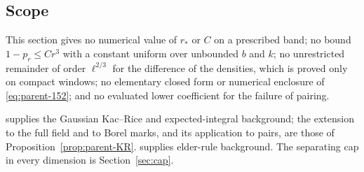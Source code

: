\subsection{Scope}\label{ssec:parent-scope}

\begin{remark}\label{rem:parent-scope}
This section gives no numerical value of $r_*$ or $C$ on a prescribed band; no bound $1-p_r\le Cr^3$ with a constant uniform over unbounded $b$ and $k$; no unrestricted remainder of order $\ell^{2/3}$ for the difference of the densities, which is proved only on compact windows; no elementary closed form or numerical enclosure of \eqref{eq:parent-152}; and no evaluated lower coefficient for the failure of pairing.
\end{remark}

\begin{remark}[background]\label{rem:parent-sources}
\cite[\S\S2 and 7]{AAL} supplies the Gaussian Kac--Rice and expected-integral background; the extension to the full field and to Borel marks, and its application to pairs, are those of Proposition~\ref{prop:parent-KR}. \cite[\S3]{Curry} supplies elder-rule background. The separating cap in every dimension is Section~\ref{sec:cap}.
\end{remark}
